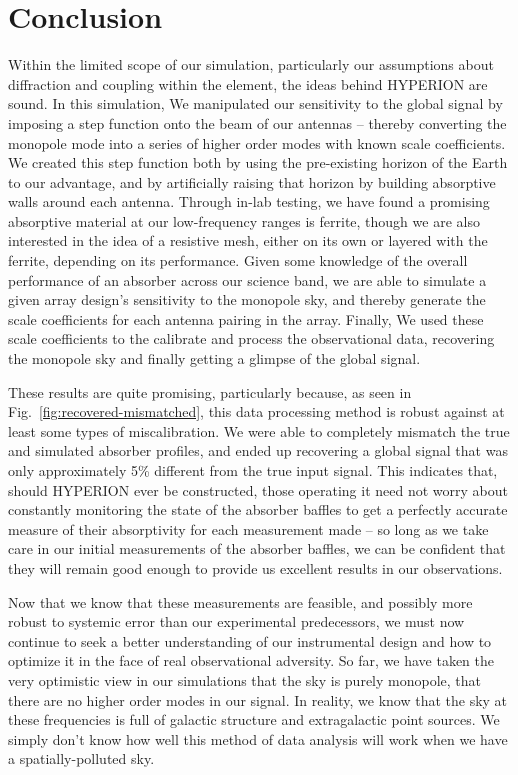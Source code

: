 \chapter{Conclusion}

Within the limited scope of our simulation, particularly our assumptions about 
diffraction and coupling within the element, the ideas behind HYPERION are 
sound.  In this simulation, We manipulated our sensitivity to the global signal 
by imposing a step function onto the beam of our antennas -- thereby converting 
the monopole mode into a series of higher order modes with known scale 
coefficients. We created this step function both by using the pre-existing 
horizon of the Earth to our advantage, and by artificially raising that horizon 
by building absorptive walls around each antenna. Through in-lab testing, we 
have found a promising absorptive material at our low-frequency ranges is 
ferrite, though we are also interested in the idea of a resistive mesh, either 
on its own or layered with the ferrite, depending on its performance. Given 
some knowledge of the  overall performance of an absorber across our science 
band, we are able to simulate a given array design's sensitivity to the 
monopole sky, and thereby generate the scale coefficients for each antenna 
pairing in the array.  Finally, We used these scale coefficients to the 
calibrate and process the observational data, recovering the monopole sky and 
finally getting a glimpse of the global signal.

These results are quite promising, particularly because, as seen in 
Fig.~\ref{fig:recovered-mismatched}, this data processing method is robust 
against at least some types of miscalibration. We were able to completely 
mismatch the true and simulated absorber profiles, and ended up recovering a 
global signal that was only approximately 5\% different from the true input 
signal. This indicates that, should HYPERION ever be constructed, those 
operating it need not worry about constantly monitoring the state of the 
absorber baffles to get a perfectly accurate measure of their absorptivity for 
each measurement made -- so long as we take care in our initial measurements of 
the absorber baffles, we can be confident that they will remain good enough to 
provide us excellent results in our observations.

Now that we know that these measurements are feasible, and possibly more robust 
to systemic error than our experimental predecessors, we must now continue to 
seek a better understanding of our instrumental design and how to optimize it 
in the face of real observational adversity. So far, we have taken the very 
optimistic view in our simulations that the sky is purely monopole, that there 
are no higher order modes in our signal. In reality, we know that the sky at 
these frequencies is full of galactic structure and extragalactic point 
sources. We simply don't know how well this method of data analysis will work 
when we have a spatially-polluted sky.

